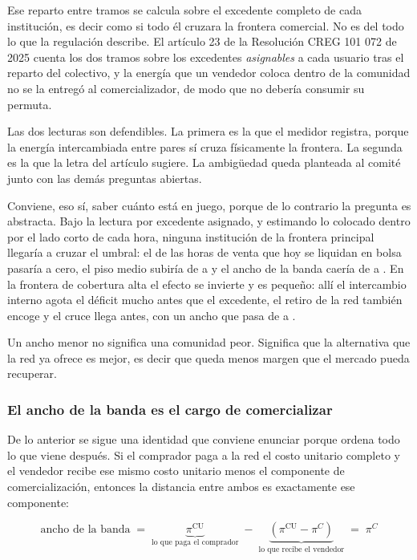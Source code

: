 Ese reparto entre tramos se calcula sobre el excedente completo de cada
institución, es decir como si todo él cruzara la frontera comercial. No es
del todo lo que la regulación describe. El artículo 23 de la Resolución
CREG 101 072 de 2025 cuenta los dos tramos sobre los excedentes
\emph{asignables} a cada usuario tras el reparto del colectivo, y la energía
que un vendedor coloca dentro de la comunidad no se la entregó al
comercializador, de modo que no debería consumir su permuta.

Las dos lecturas son defendibles. La primera es la que el medidor registra,
porque la energía intercambiada entre pares sí cruza físicamente la
frontera. La segunda es la que la letra del artículo sugiere. La ambigüedad
queda planteada al comité junto con las demás preguntas abiertas.

Conviene, eso sí, saber cuánto está en juego, porque de lo contrario la
pregunta es abstracta. Bajo la lectura por excedente asignado, y estimando lo
colocado dentro por el lado corto de cada hora, ninguna institución de la
frontera principal llegaría a cruzar el umbral: el  de las horas de
venta que hoy se liquidan en bolsa pasaría a cero, el piso medio subiría de
 a  y el ancho de la banda caería de
 a . En la frontera de cobertura alta el efecto se
invierte y es pequeño: allí el intercambio interno agota el déficit mucho
antes que el excedente, el retiro de la red también encoge y el cruce llega
antes, con un ancho que pasa de  a .

Un ancho menor no significa una comunidad peor. Significa que la alternativa
que la red ya ofrece es mejor, es decir que queda menos margen que el mercado
pueda recuperar.

\subsubsection{El ancho de la banda es el cargo de comercializar}

De lo anterior se sigue una identidad que conviene enunciar porque ordena
todo lo que viene después. Si el comprador paga a la red el costo unitario
completo y el vendedor recibe ese mismo costo unitario menos el componente
de comercialización, entonces la distancia entre ambos es exactamente ese
componente:

\begin{equation}
\text{ancho de la banda} \;=\;
\underbrace{\pi^{\mathrm{CU}}}_{\text{lo que paga el comprador}}
\;-\;
\underbrace{\left(\pi^{\mathrm{CU}} - \pi^{C}\right)}_{\text{lo que recibe el vendedor}}
\;=\; \pi^{C}
\label{eq:precios-ancho}
\end{equation}

